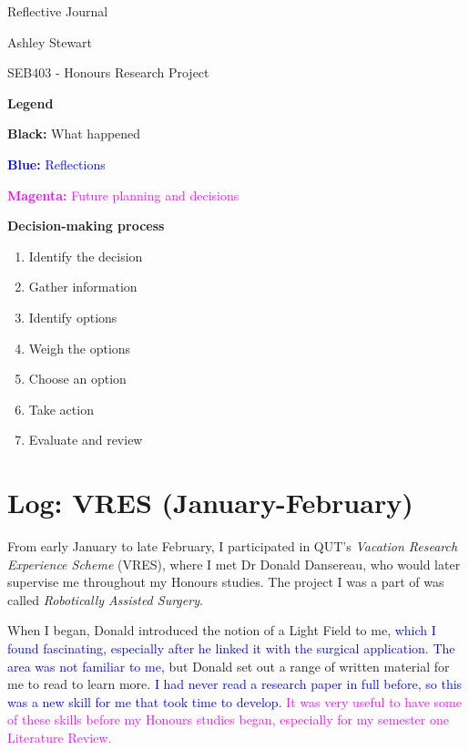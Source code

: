 \documentclass[a4paper, 12pt]{article}
\begin{document}
\begin{center}
    {\huge Reflective Journal \par}
    {\large Ashley Stewart\par}
    SEB403 - Honours Research Project
\end{center}

\tableofcontents

\newpage
{\large\textbf{Legend}}

\textbf{Black:} What happened 

\textcolor{Blue}{\textbf{Blue:} Reflections}

\textcolor{Magenta}{\textbf{Magenta:} Future planning and decisions}

\vspace{8mm}

{\large\textbf{Decision-making process}}
\begin{enumerate}
  \item{Identify the decision}
  \item{Gather information}
  \item{Identify options}
  \item{Weigh the options}
  \item{Choose an option}
  \item{Take action}
  \item{Evaluate and review}
\end{enumerate}

\newpage
\section{Log: VRES (January-February)}
From early January to late February, I participated in QUT's \emph{Vacation Research Experience Scheme} (VRES), where I met Dr Donald Dansereau, who would later supervise me throughout my Honours studies. The project I was a part of was called \emph{Robotically Assisted Surgery}.

When I began, Donald introduced the notion of a Light Field to me, \textcolor{Blue}{which I found fascinating, especially after he linked it with the surgical application. The area was not familiar to me,} but Donald set out a range of written material for me to read to learn more. \textcolor{Blue}{I had never read a research paper in full before, so this was a new skill for me that took time to develop. }\textcolor{Magenta}{It was very useful to have some of these skills before my Honours studies began, especially for my semester one Literature Review.}
\end{document}
